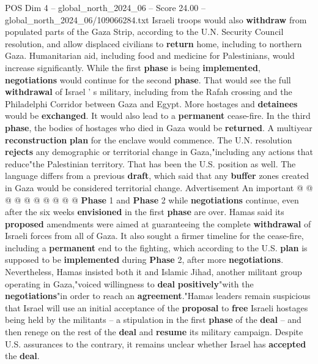 \begin{textsample}{POS Dim 4 – global\_north\_2024\_06 – Score 24.00 – global\_north\_2024\_06/109066284.txt}  \label{ex:f4_pos_147}
Israeli troops would also \textbf{withdraw} from populated parts of the Gaza Strip, according to the U.N.
Security Council resolution, and allow displaced civilians to \textbf{return} home, including to northern Gaza.
Humanitarian aid, including food and medicine for Palestinians, would increase significantly.
While the first \textbf{phase} is being \textbf{implemented}, \textbf{negotiations} would continue for the second \textbf{phase}.
That would see the full \textbf{withdrawal} of Israel ' s military, including from the Rafah crossing and the Philadelphi Corridor between Gaza and Egypt.
More hostages and \textbf{detainees} would be \textbf{exchanged}.
It would also lead to a \textbf{permanent} cease-fire.
In the third \textbf{phase}, the bodies of hostages who died in Gaza would be \textbf{returned}.
A multiyear \textbf{reconstruction} \textbf{plan} for the enclave would commence.
The U.N. resolution \textbf{rejects} any demographic or territorial change in Gaza,"including any actions that reduce"the Palestinian territory.
That has been the U.S. position as well.
The language differs from a previous \textbf{draft}, which said that any \textbf{buffer} zones created in Gaza would be considered territorial change.
Advertisement An important @ @ @ @ @ @ @ @ @ @ \textbf{Phase} 1 and \textbf{Phase} 2 while \textbf{negotiations} continue, even after the six weeks \textbf{envisioned} in the first \textbf{phase} are over.
Hamas said its \textbf{proposed} amendments were aimed at guaranteeing the complete \textbf{withdrawal} of Israeli forces from all of Gaza.
It also sought a firmer timeline for the cease-fire, including a \textbf{permanent} end to the fighting, which according to the U.S. \textbf{plan} is supposed to be \textbf{implemented} during \textbf{Phase} 2, after more \textbf{negotiations}.
Nevertheless, Hamas insisted both it and Islamic Jihad, another militant group operating in Gaza,"voiced willingness to \textbf{deal} \textbf{positively}"with the \textbf{negotiations}"in order to reach an \textbf{agreement}."Hamas leaders remain suspicious that Israel will use an initial acceptance of the \textbf{proposal} to \textbf{free} Israeli hostages being held by the militants -- a stipulation in the first \textbf{phase} of the \textbf{deal} -- and then renege on the rest of the \textbf{deal} and \textbf{resume} its military campaign.
Despite U.S. assurances to the contrary, it remains unclear whether Israel has \textbf{accepted} the \textbf{deal}.

\end{textsample}
